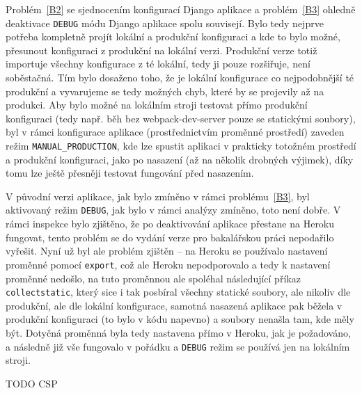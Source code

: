 Problém~\ref{B2} se sjednocením konfigurací Django aplikace a problém~\ref{B3} ohledně deaktivace \verb|DEBUG| módu Django aplikace spolu souvisejí. Bylo tedy nejprve potřeba kompletně projít lokální a produkční konfiguraci a kde to bylo možné, přesunout konfiguraci z produkční na lokální verzi. Produkční verze totiž importuje všechny konfigurace z té lokální, tedy ji pouze rozšiřuje, není soběstačná. Tím bylo dosaženo toho, že je lokální konfigurace co nejpodobnější té produkční a vyvarujeme se tedy možných chyb, které by se projevily až na produkci. Aby bylo možné na lokálním stroji testovat přímo produkční konfiguraci (tedy např. běh bez webpack-dev-server pouze se statickými soubory), byl v rámci konfigurace aplikace (prostřednictvím proměnné prostředí) zaveden režim \verb|MANUAL_PRODUCTION|, kde lze spustit aplikaci v prakticky totožném prostředí a produkční konfiguraci, jako po nasazení (až na několik drobných výjimek), díky tomu lze ještě přesněji testovat fungování před nasazením. 

V původní verzi aplikace, jak bylo zmíněno v rámci problému~\ref{B3}, byl aktivovaný režim \verb|DEBUG|, jak bylo v rámci analýzy zmíněno, toto není dobře. V rámci inspekce bylo zjištěno, že po deaktivování aplikace přestane na Heroku fungovat, tento problém se do vydání verze pro bakalářskou práci nepodařilo vyřešit. Nyní už byl ale problém zjištěn -- na Heroku se používalo nastavení proměnné pomocí \verb|export|, což ale Heroku nepodporovalo a tedy k nastavení proměnné nedošlo, na tuto proměnnou ale spoléhal následující příkaz \verb|collectstatic|, který sice i tak posbíral všechny statické soubory, ale nikoliv dle produkční, ale dle lokální konfigurace, samotná nasazená aplikace pak běžela v produkční konfiguraci (to bylo v kódu napevno) a soubory nenašla tam, kde měly být. Dotyčná proměnná byla tedy nastavena přímo v Heroku, jak je požadováno, a následně již vše fungovalo v pořádku a \verb|DEBUG| režim se používá jen na lokálním stroji.

TODO CSP

